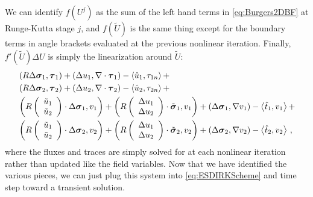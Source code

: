 \documentclass[Proposal.tex]{subfiles}
\begin{document}
We can identify $f(U^j)$ as the sum of the left hand terms in \eqref{eq:Burgers2DBF} at Runge-Kutta stage $j$, 
and $f(\tilde U)$ is the same thing except for the boundary terms in angle brackets evaluated at the previous nonlinear iteration.
Finally, $f'(\tilde U)\Delta U$ is simply the linearization around $\tilde U$:
\begin{equation}
\label{eq:Burgers2DBF}
	\begin{aligned}
		&\left( R\Delta\boldsymbol\sigma_1,\boldsymbol\tau_1 \right)+\left( \Delta u_1,\nabla\cdot\boldsymbol\tau_1 \right)-\left\langle \hat u_1,\tau_{1n} \right\rangle+\\
		&\left( R\Delta\boldsymbol\sigma_2,\boldsymbol\tau_2 \right)+\left( \Delta u_2,\nabla\cdot\boldsymbol\tau_2 \right)-\left\langle \hat u_2,\tau_{2n} \right\rangle+\\
		&\left( R\left( \begin{array}{c} \tilde u_1\\ \tilde u_2\\ \end{array} \right)\cdot\Delta\boldsymbol\sigma_1,v_1 \right)+\left( R\left( \begin{array}{c} \Delta u_1\\ \Delta u_2\\ \end{array} \right)\cdot\tilde{\boldsymbol\sigma}_1,v_1 \right)+\left( \Delta\boldsymbol\sigma_1,\nabla v_1 \right)-\left\langle \hat t_1,v_1 \right\rangle+\\
		&\left( R\left( \begin{array}{c} \tilde u_1\\ \tilde u_2\\ \end{array} \right)\cdot\Delta\boldsymbol\sigma_2,v_2 \right)+\left( R\left( \begin{array}{c} \Delta u_1\\ \Delta u_2\\ \end{array} \right)\cdot\tilde{\boldsymbol\sigma}_2,v_2 \right)+\left( \Delta\boldsymbol\sigma_2,\nabla v_2 \right)-\left\langle \hat t_2,v_2 \right\rangle\,,
	\end{aligned}
\end{equation}
where the fluxes and traces are simply solved for at each nonlinear iteration rather than updated like the field variables.
Now that we have identified the various pieces, we can just plug this system into \eqref{eq:ESDIRKScheme} and time step toward a transient solution.
\end{document}
